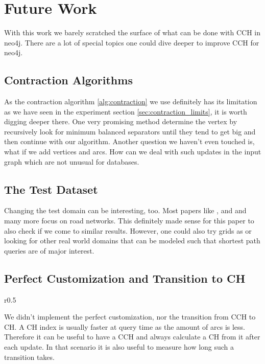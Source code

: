 \chapter{Future Work}

With this work we barely scratched the surface of what can be done with CCH in neo4j. 
There are a lot of special topics one could dive deeper to improve CCH for neo4j.

\section{Contraction Algorithms}

As the contraction algorithm \ref{alg:contraction} we use definitely has its limitation as we have seen in the experiment section \ref{sec:contraction_limits}, it is worth digging
deeper there. One very promising method determine the vertex by recursively look for minimum balanced separators until they tend to get big and then continue with our algorithm.
Another question we haven't even touched is, what if we add vertices and arcs. How can we deal with such updates in the input graph which are not unusual for databases.

\section{The Test Dataset}

Changing the test domain can be interesting, too. Most papers like \cite[CCH]{CCH}, and \cite[CH]{Geisberger_2012} and many more focus on road networks. This definitely made sense for this
paper to also check if we come to similar results. However, one could also try grids as \cite[Storandt]{storandt2013contraction} or looking for other real world domains that can be modeled such that shortest path queries are of major interest.

\section{Perfect Customization and Transition to CH}

\begin{wrapfigure}{r}{0.5\textwidth}
    
    
\end{wrapfigure}

We didn't implement the perfect customization, nor the transition from CCH to CH. A CH index is usually faster at query time as the amount of arcs is less. Therefore it can be useful to have 
a CCH and always calculate a CH from it after each update. In that scenario it is also useful to measure how long such a transition takes.

